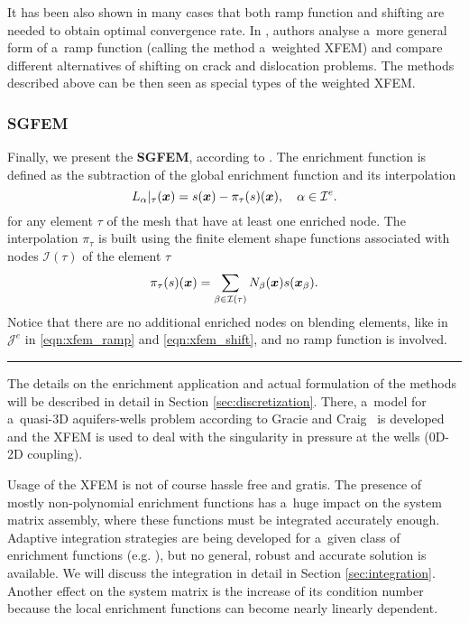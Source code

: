 It has been also shown in many cases that both ramp function and shifting are needed to obtain optimal convergence rate.
In \cite{ventura_fast_2009}, authors analyse a~more general form of a~ramp function (calling the method a~weighted XFEM)
and compare different alternatives of shifting on crack and dislocation problems. The methods described above can be then seen
as special types of the weighted XFEM. 


\subsubsection{SGFEM}
Finally, we present the \textbf{SGFEM}, according to \cite{babuska_stable_2012,gupta_stable_2013}. 
The enrichment function is defined as the subtraction of the global enrichment function and its interpolation 
\begin{equation} \label{eqn:sgfem_enrich}
    L_{\alpha}|_{\tau}(\mathbf{\boldsymbol{x}}) = s(\mathbf{\boldsymbol{x}}) - \pi_\tau (s)(\mathbf{\boldsymbol{x}}),
    \quad \alpha\in\mathcal{I}^e.
\end{equation} 
for any element $\tau$ of the mesh that have at least one enriched node.
The interpolation $\pi_\tau$ is built using the finite element shape functions
associated with nodes $\mathcal{I}(\tau)$ of the element $\tau$
\begin{equation} \label{eqn:sgfem_interpolation}
    \pi_\tau (s)(\mathbf{\boldsymbol{x}}) = \sum_{\beta\in\mathcal{I}(\tau)} N_\beta(\mathbf{\boldsymbol{x}}) s(\mathbf{\boldsymbol{x}}_\beta).
\end{equation}
Notice that there are no additional enriched nodes on blending elements, like in $\mathcal{J}^e$ in 
\eqref{eqn:xfem_ramp} and \eqref{eqn:xfem_shift}, and no ramp function is involved.

\par\noindent\rule{\textwidth}{1pt}

The details on the enrichment application and actual formulation of the methods will be described in detail in Section
\ref{sec:discretization}. There, a~model for a~quasi-3D aquifers-wells problem according to Gracie and Craig~\cite{gracie_modelling_2010,craig_using_2011}
is developed and the XFEM is used to deal with the singularity in pressure at the wells (0D-2D coupling).

Usage of the XFEM is not of course hassle free and gratis. The presence of mostly non-polynomial enrichment functions
has a~huge impact on the system matrix assembly, where these functions must be integrated accurately enough.
Adaptive integration strategies are being developed for a~given class of enrichment functions (e.g. \cite{ventura_fast_2009}), 
but no general, robust and accurate solution is available. We will discuss the integration in detail in Section \ref{sec:integration}.
Another effect on the system matrix is the increase of its condition number because the local enrichment functions can
become nearly linearly dependent. 

